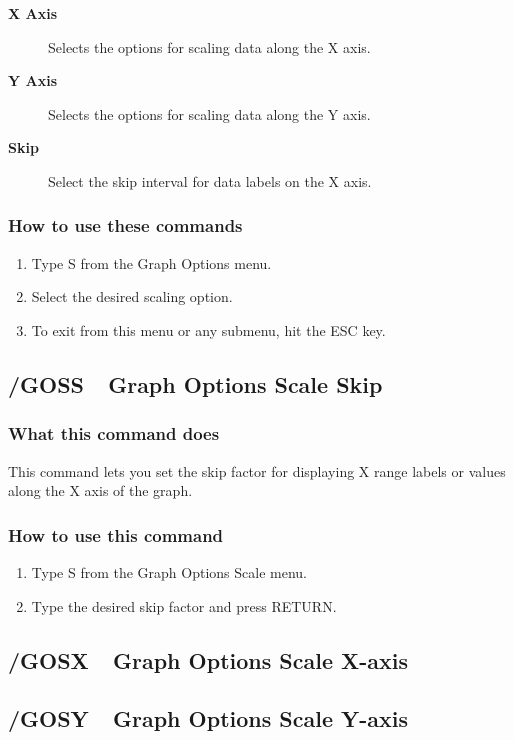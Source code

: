 \begin{description}
\item[{\bf X Axis}]{  Selects the options for scaling data along the X axis.}
\item[{\bf Y Axis}]{  Selects the options for scaling data along the Y axis.}
\item[{\bf Skip}]  {Select the skip interval for data labels on the X axis.}
\end{description}

\subsubsection*{How to use these commands}
\begin{enumerate}
\item{Type S from the Graph Options menu.}
\item{Select the desired scaling option.}
\item{To exit from this menu or any submenu, hit the ESC key.}
\end{enumerate}

\subsection*{/GOSS\ \    Graph Options Scale Skip}

\subsubsection*{What this command does}
This command lets you set the skip factor for displaying X range 
labels or values along the X axis of the graph.

\subsubsection*{How to use this command}
\begin{enumerate}
\item{Type S from the Graph Options Scale menu.}
\item{Type the desired skip factor and press RETURN.}
\end{enumerate}

\subsection*{/GOSX\ \    Graph Options Scale X-axis}
\subsection*{/GOSY\ \    Graph Options Scale Y-axis}

